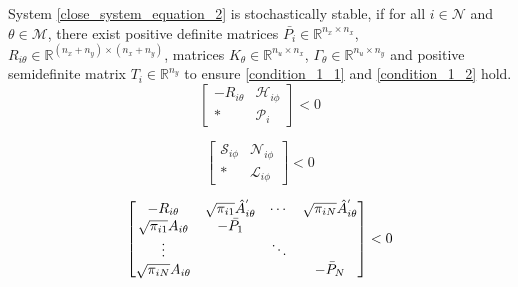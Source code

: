\documentclass[conference]{IEEEtran}
\begin{document}
%
%
%

System \eqref{close_system_equation_2} is stochastically stable, if for all $i \in \mathcal{N}$ and $\theta \in \mathcal{M}$, there exist positive definite matrices $\bar{P_i} \in \mathbb{R}^{n_x\times n_x}$, $R_{i\theta } \in \mathbb{R}^{(n_x+n_y)\times(n_x+n_y)}$, matrices $K_{\theta} \in \mathbb{R}^{n_u\times n_x}$, $\varGamma_{\theta} \in \mathbb{R}^{n_u \times n_y}$ and positive semidefinite matrix $T_{i}\in \mathbb{R}^{n_y}$ to  ensure \eqref{condition_1_1} and \eqref{condition_1_2} hold.
\begin{equation}\label{condition_1_1}
\begin{bmatrix}
-R_{i\theta}&\mathscr{H}_{i\phi}\\
*&\mathscr{P}_{i}
\end{bmatrix}<0
\end{equation}


\begin{equation}\label{condition_1_2}
\begin{bmatrix}
\mathscr{S}_{i\phi}&\mathscr{N}_{i\phi}\\
*&\mathscr{L}_{i\phi}
\end{bmatrix}<0
\end{equation}


\begin{equation}\notag
\begin{bmatrix}
-R_{i\theta}&\sqrt{\pi_{i1}}\hat{A}^{'}_{i\theta}&\cdots&\sqrt{\pi_{iN}}\hat{A}^{'}_{i\theta}\\
\sqrt{\pi_{i1}}A_{i\theta}&-\bar{P_1}\\
\vdots & &\ddots\\
\sqrt{\pi_{iN}}A_{i\theta}&& & -\bar{P}_{N}
\end{bmatrix}<0
\end{equation}
\end{document}
